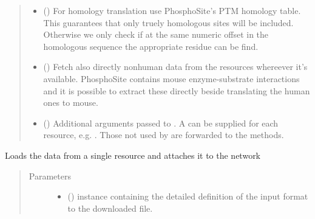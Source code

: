 \documentclass[letterpaper,10pt,english]{sphinxmanual}
\begin{document}
\begin{fulllineitems}
\begin{fulllineitems}
\begin{quote}
\begin{description}
\begin{itemize}
\item {} 
 () \textendash{} For homology translation use
PhosphoSite’s PTM homology table. This guarantees that only
truely homologous sites will be included. Otherwise we only
check if at the same numeric offset in the homologous sequence
the appropriate residue can be find.

\item {} 
 () \textendash{} Fetch also directly nonhuman
data from the resources whereever it’s available. PhosphoSite
contains mouse enzyme-substrate interactions and it is possible
to extract these directly beside translating the human ones
to mouse.

\item {} 
 () \textendash{} Additional arguments passed to .
A  can be supplied for each resource, e.g.
.
Those not used by  are forwarded to the
 methods.

\end{itemize}

\end{description}\end{quote}

\end{fulllineitems}


\begin{fulllineitems}
\label{\detokenize{reference:pypath.main.PyPath.load_resource}}
Loads the data from a single resource and attaches it to the
network
\begin{quote}\begin{description}
\item[{Parameters}] \leavevmode\begin{itemize}
\item {} 
 () \textendash{}  instance
containing the detailed definition of the input format to
the downloaded file.


\end{itemize}
\end{description}
\end{quote}
\end{fulllineitems}
\end{fulllineitems}
\end{document}

